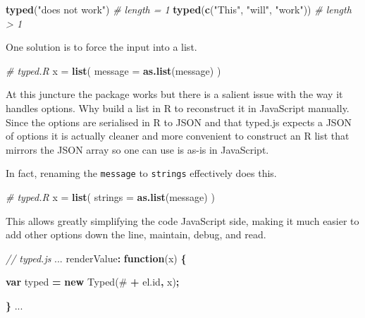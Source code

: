 \documentclass[
]{krantz}
\makeatletter
\newenvironment{Shaded}{\begin{snugshade}}{\end{snugshade}}
\newcommand{\AttributeTok}[1]{\textcolor[rgb]{0.61,0.61,0.61}{#1}}
\newcommand{\CommentTok}[1]{\textcolor[rgb]{0.37,0.37,0.37}{\textit{#1}}}
\newcommand{\DataTypeTok}[1]{\textcolor[rgb]{0.27,0.27,0.27}{#1}}
\newcommand{\KeywordTok}[1]{\textcolor[rgb]{0.27,0.27,0.27}{\textbf{#1}}}
\newcommand{\NormalTok}[1]{#1}
\newcommand{\OperatorTok}[1]{\textcolor[rgb]{0.43,0.43,0.43}{\textbf{#1}}}
\newcommand{\StringTok}[1]{\textcolor[rgb]{0.5,0.5,0.5}{#1}}
\newcommand{\VariableTok}[1]{\textcolor[rgb]{0,0,0}{#1}}
\newenvironment{kframe}{%
\medskip{}
\setlength{\fboxsep}{.8em}
 \def\at@end@of@kframe{}%
 \ifinner\ifhmode%
  \def\at@end@of@kframe{\end{minipage}}%
  \begin{minipage}{\columnwidth}%
 \fi\fi%
 \def\FrameCommand##1{\hskip\@totalleftmargin \hskip-\fboxsep
 \colorbox{shadecolor}{##1}\hskip-\fboxsep
     \hskip-\linewidth \hskip-\@totalleftmargin \hskip\columnwidth}%
 \MakeFramed {\advance\hsize-\width
   \@totalleftmargin\z@ \linewidth\hsize
   \@setminipage}}%
 {\par\unskip\endMakeFramed%
 \at@end@of@kframe}
\renewenvironment{Shaded}{\begin{kframe}}{\end{kframe}}
\makeatother
\begin{document}
\begin{Shaded}
\begin{Highlighting}[]
\KeywordTok{typed}\NormalTok{(}\StringTok{"does not work"}\NormalTok{) }\CommentTok{\# length =  1}
\KeywordTok{typed}\NormalTok{(}\KeywordTok{c}\NormalTok{(}\StringTok{"This"}\NormalTok{, }\StringTok{"will"}\NormalTok{, }\StringTok{"work"}\NormalTok{)) }\CommentTok{\# length > 1}
\end{Highlighting}
\end{Shaded}

One solution is to force the input into a list.

\begin{Shaded}
\begin{Highlighting}[]
\CommentTok{\# typed.R}
\NormalTok{x =}\StringTok{ }\KeywordTok{list}\NormalTok{(}
  \DataTypeTok{message =} \KeywordTok{as.list}\NormalTok{(message)}
\NormalTok{)}
\end{Highlighting}
\end{Shaded}

At this juncture the package works but there is a salient issue with the way it handles options. Why build a list in R to reconstruct it in JavaScript manually. Since the options are serialised in R to JSON and that typed.js expects a JSON of options it is actually cleaner and more convenient to construct an R list that mirrors the JSON array so one can use is as-is in JavaScript.

In fact, renaming the \texttt{message} to \texttt{strings} effectively does this.

\begin{Shaded}
\begin{Highlighting}[]
\CommentTok{\# typed.R}
\NormalTok{x =}\StringTok{ }\KeywordTok{list}\NormalTok{(}
  \DataTypeTok{strings =} \KeywordTok{as.list}\NormalTok{(message)}
\NormalTok{)}
\end{Highlighting}
\end{Shaded}

This allows greatly simplifying the code JavaScript side, making it much easier to add other options down the line, maintain, debug, and read.

\begin{Shaded}
\begin{Highlighting}[]
\CommentTok{// typed.js}
\NormalTok{...}
\NormalTok{renderValue}\OperatorTok{:} \KeywordTok{function}\NormalTok{(x) }\OperatorTok{\{}

  \KeywordTok{var}\NormalTok{ typed }\OperatorTok{=} \KeywordTok{new} \AttributeTok{Typed}\NormalTok{(}\StringTok{\textquotesingle{}\#\textquotesingle{}} \OperatorTok{+} \VariableTok{el}\NormalTok{.}\AttributeTok{id}\OperatorTok{,}\NormalTok{ x)}\OperatorTok{;}

\OperatorTok{\}}
\NormalTok{...}
\end{Highlighting}
\end{Shaded}
\end{document}
